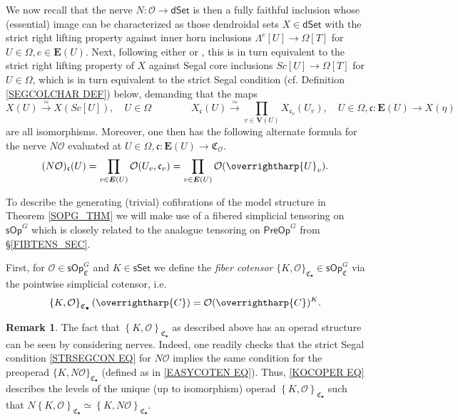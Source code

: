\documentclass[a4paper,10pt]{article}%
\numberwithin{equation}{section}
\numberwithin{figure}{section}
\theoremstyle{definition} %
\newtheorem{remark}[equation]{Remark}%
\newcommand{\set}[1]{\left\{#1\right\}}%
\newcommand{\vect}[1]{\text{\overrightharp{\ensuremath{#1}}}}
\renewcommand{\O}{\ensuremath{\mathcal O}}
\newcommand{\1}{\ensuremath{\mathbbm 1}}%
\begin{document}
We now recall \cite[Prop. 5.3 and Thm. 6.1]{MW09}
that the nerve
$N \colon \mathsf{\O} \to \mathsf{dSet}$
is then a fully faithful inclusion
whose (essential) image can be characterized
as those
dendroidal sets $X \in \mathsf{dSet}$
with the strict right lifting property against inner horn inclusions
$\Lambda^e[U] \to \Omega[T]$ for $U\in\Omega,e\in \boldsymbol{E}(U)$.
Next,
following either \cite[Prop. 2.5 and Cor. 2.6]{CM13a}
or \cite[Props. 3.22 and 3.31]{BP_edss},
this is in turn equivalent to the strict right lifting property of $X$
against Segal core inclusions
$Sc[U] \to \Omega[T]$ for $U \in \Omega$,
which is in turn equivalent to the strict Segal condition
(cf. Definition \ref{SEGCOLCHAR DEF}) below,
demanding that the maps
\begin{equation}\label{STRSEGCON EQ}
	X(U)
	\xrightarrow{\simeq}
	X(Sc[U]),
	\quad
	U \in \Omega
\qquad \qquad
	X_{\mathfrak{c}}(U) 
	\xrightarrow{\simeq}
	\prod_{v \in \boldsymbol{V}(U)}
	X_{\mathfrak{c}_v}(U_v),
	\quad
	U \in \Omega,
	\mathfrak{c} \colon 
	\boldsymbol{E}(U) \to X(\eta)
\end{equation}
are all isomorphisms.
Moreover, one then has the following alternate formula for the nerve
$N \O$ evaluated at
$U\in \Omega,
\mathfrak{c} \colon \boldsymbol{E}(U) \to \mathfrak{C}_{\O}$.
\begin{equation}\label{ALTNER EQ}
	(N \O)_{\mathfrak{c}} (U) 
	= 
	\prod_{v \in \boldsymbol{E}(U)}
	\O(U_v,\mathfrak{c}_v)
	=
	\prod_{v \in \boldsymbol{E}(U)}
	\O(\vect{U}_v).
\end{equation}



To describe the generating (trivial) cofibrations of 
the model structure in Theorem \ref{SOPG_THM}
we will make use of a fibered simplicial tensoring on
$\mathsf{sOp}^G$
which is closely related to the analogue tensoring on
$\mathsf{PreOp}^G$
from \S \ref{FIBTENS_SEC}.

First, for $\O \in \mathsf{sOp}^G_{\mathfrak{C}}$
and 
$K \in \mathsf{sSet}$
we define the \emph{fiber cotensor}
$\{K,\O\}_{\mathfrak{C}_{\bullet}} 
\in \mathsf{sOp}^G_{\mathfrak{C}}$
via the pointwise simplicial cotensor, i.e.
\begin{equation}\label{KOCOPER EQ}
	\set{K, \O}_{\mathfrak{C}_{\bullet}} (\vect C) = \O(\vect C)^K.
\end{equation}


\begin{remark}\label{NERTENID REM}
	The fact that 
	$\set{K, \O}_{\mathfrak{C}_{\bullet}}$
	as described above has an operad structure
	can be seen by considering nerves. 
	Indeed, 
	one readily checks that the strict Segal condition
	\eqref{STRSEGCON EQ} for $N\O$
	implies the same condition for 
	the preoperad
	$\{K,N \O\}_{\mathfrak{C}_{\bullet}}$
	(defined as in \eqref{EASYCOTEN EQ}).
	Thus, \eqref{KOCOPER EQ}
	describes the levels
	of the unique (up to isomorphism) operad
	$\set{K, \O}_{\mathfrak{C}_{\bullet}}$
	such that
	$N \set{K, \O}_{\mathfrak{C}_{\bullet}} 
	\simeq
	\set{K, N \O}_{\mathfrak{C}_{\bullet}}$.
\end{remark}
\end{document}
